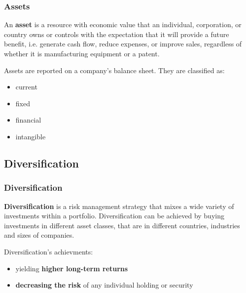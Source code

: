 \documentclass{beamer}
\begin{document}
\begin{frame}
\frametitle{\textbf{Assets}}

\begin{definition}
\justifying
An \textbf{asset} is a resource with economic value that an individual, corporation, or country owns or controls with the expectation that it will provide a future benefit, i.e. generate cash flow, reduce expenses, or improve sales, regardless of whether it is manufacturing equipment or a patent.
\end{definition}

\vspace{0.8cm}

\justifying
Assets are reported on a company's balance sheet. They are classified as:
\begin{itemize}
	\item current
	\item fixed
	\item financial
	\item intangible
\end{itemize}

\end{frame}





\subsection{Diversification}

\begin{frame}
\frametitle{\textbf{Diversification}}

\begin{definition}
\justifying
\textbf{Diversification} is a risk management strategy that mixes a wide variety of investments within a portfolio. Diversification can be achieved by buying investments in different asset classes, that are in different countries, industries and sizes of companies.
\end{definition}

\vspace{0.4cm}
\justifying
Diversification's achievments:
\begin{itemize}
	\justifying
	\item yielding \textbf{higher long-term returns}
	\item \textbf{decreasing the risk} of any individual holding or security
\end{itemize}

\end{frame}
\end{document}
